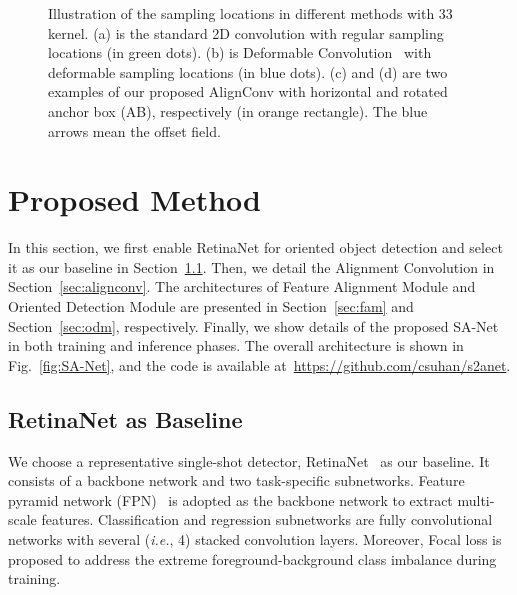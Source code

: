 \documentclass[10pt,journal,final]{IEEEtran}
\def\ie{{\em i.e.}}
\begin{document}
\begin{figure*}[t!]
  \vspace{-3mm}
  \centering
  \vspace{-2mm}
  \caption{Illustration of the sampling locations in different methods with 33 kernel. (a) is the standard 2D convolution with regular sampling locations (in green dots). (b) is Deformable Convolution~\cite{dai2017dcn} with deformable sampling locations (in blue dots). (c) and (d) are two examples of our proposed AlignConv with horizontal and rotated anchor box (AB), respectively (in orange rectangle). The blue arrows mean the offset field.}
  \label{fig:diff_convs}
   \vspace{-3mm}
\end{figure*}

\section{Proposed Method}
\label{sec:methods}
In this section, we first enable RetinaNet for oriented object detection and select it as our baseline in Section~\ref{sec:retinanet}. Then, we detail the Alignment Convolution in Section~\ref{sec:alignconv}. The architectures of Feature Alignment Module and Oriented Detection Module are presented in Section~\ref{sec:fam} and Section~\ref{sec:odm}, respectively. Finally, we show details of the proposed SA-Net in both training and inference phases. The overall architecture is shown in Fig.~\ref{fig:SA-Net}, and the code is available at~\url{https://github.com/csuhan/s2anet}.

\vspace*{-3mm}
\subsection{RetinaNet as Baseline}
\label{sec:retinanet}
We choose a representative single-shot detector, RetinaNet~\cite{lin2017focal} as our baseline. It consists of a backbone network and two task-specific subnetworks. Feature pyramid network (FPN)~\cite{lin2017feature} is adopted as the backbone network to extract multi-scale features. Classification and regression subnetworks are fully convolutional networks with several (\ie, 4) stacked convolution layers. Moreover, Focal loss is proposed to address the extreme foreground-background class imbalance during training. 
\end{document}

